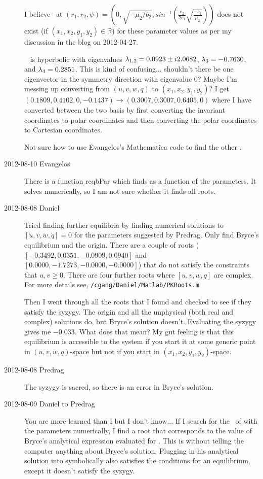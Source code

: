 \begin{description}
I believe \reqv\ at $\left(r_1,r_2,\psi\right) =\left(0,\sqrt{-\mu_2 /
b_2}, sin^{-1}\left(\frac{e_2}{2 c_1}
\sqrt{\frac{-b_2}{\mu_2}}\right)\right)$ does not exist (if
$(x_1,x_2,y_1,y_2) \in \mathbb{R}$) for these parameter values as per my
discussion in the blog on 2012-04-27.

\Reqv\  is hyperbolic with eigenvalues $\lambda_{1,2} = 0.0923
\pm i 2.0682$, $\lambda_3 = -0.7630$, and $\lambda_4 = 0.2851$. This is
kind of confusing... shouldn't there be one eigenvector in the symmetry
direction with eigenvalue $0$? Maybe I'm messing up converting from
$(u,v,w,q)$ to $(x_1,x_2,y_1,y_2)$? I get $(0.1809,0.4102,0,-0.1437)
\rightarrow (0.3007,0.3007,0.6405,0)$ where I have converted between the
two basis by first converting the invariant coordinates to polar
coordinates and then converting the polar coordinates to Cartesian
coordinates.

Not sure how to use Evangelos's Mathematica code to find the other \eqva .

\item[2012-08-10 Evangelos] There is a function reqbPar which finds
{\reqva} as a function of the parameters. It solves
 numerically, so I am not sure whether it finds all
roots.

\item[2012-08-08 Daniel] Tried finding further equilibria by finding
numerical solutions to $[\dot{u},\dot{v},\dot{w},\dot{q}] = 0$ for the
parameters suggested by Predrag. Only find Bryce's equilibrium and the
origin. There are a couple of roots ($[-0.3492,0.0351,-0.0909,0.0940]$
and $[0.0000,-1.7273,-0.0000,-0.0000]$) that do not satisfy the
constraints that $u,v \geq 0$. There are four further roots where
$[u,v,w,q]$ are complex. For more details see,
\texttt{/cgang/Daniel/Matlab/PKRoots.m}

Then I went through all the roots that I found and checked to see if they
satisfy the syzygy. The origin and all the unphysical (both real and
complex) solutions do, but Bryce's solution doesn't. Evaluating the
syzygy gives me $-0.033$. What does that mean? My gut feeling is that
this equilibrium is accessible to the system if you start it at some
generic point in $(u,v,w,q)$-space but not if you start in
$(x_1,x_2,y_1,y_2)$-space.

\item[2012-08-08 Predrag]
The syzygy  is sacred, so there is an error in Bryce's
solution.

\item[2012-08-09 Daniel to Predrag] You are more learned than I but I
don't know... If I search for the \eqva\ of  with the
parameters  numerically, I find a root that
corresponds to the value of Bryce's analytical expression
 evaluated for . This is without
telling the computer anything about Bryce's solution. Plugging in his
analytical solution into  symbolically also satisfies
the conditions for an equilibrium, except it doesn't satisfy the syzygy.


\end{description}

